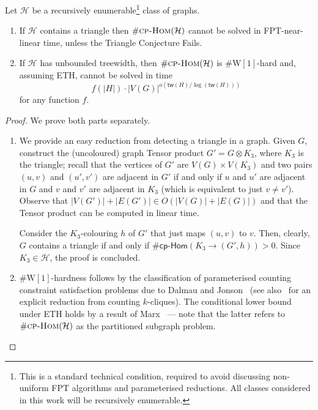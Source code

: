 \documentclass[authorcolumns,numberwithinsect]{no-lipics-v2022}
\newcommand{\W}{\mathrm{W}}
\newcommand{\cphomsprob}{\text{\sc{cp-Hom}}}
\newcommand{\cphoms}{\mathsf{cp}\text{-}\mathsf{Hom}}
\begin{document}
\begin{lemma}\label{lem:cphom_lower_bounds}
    Let $\mathcal{H}$ be a recursively enumerable\footnote{This is a standard technical condition, required to avoid discussing non-uniform FPT algorithms and parameterised reductions. All classes considered in this work will be recursively enumerable.} class of graphs.
    \begin{enumerate}
        \item If $\mathcal{H}$ contains a triangle then $\#\cphomsprob(\mathcal{H})$ cannot be solved in FPT-near-linear time, unless the Triangle Conjecture Fails.
        \item If $\mathcal{H}$ has unbounded treewidth, then $\#\cphomsprob(\mathcal{H})$ is $\#\W[1]$-hard and, assuming ETH, cannot be solved in time \[f(|H|)\cdot |V(G)|^{o(\mathsf{tw}(H)/\log(\mathsf{tw}(H)))}\]
        for any function $f$.
    \end{enumerate}
\end{lemma}
\begin{proof}
    We prove both parts separately.
\begin{enumerate}
    \item We provide an easy reduction from detecting a triangle in a graph. Given $G$, construct the (uncoloured) graph Tensor product $G' = G \otimes K_3$, where $K_3$ is the triangle; recall that the vertices of $G'$ are $V(G) \times V(K_3)$ and two pairs $(u,v)$ and $(u',v')$ are adjacent in $G'$ if and only if $u$ and $u'$ are adjacent in $G$ and $v$ and $v'$ are adjacent in $K_3$ (which is equivalent to just $v\neq v'$). Observe that $|V(G')|+|E(G')|\in O(|V(G)|+|E(G)|)$ and that the Tensor product can be computed in linear time.

    Consider the $K_3$-colouring $h$ of $G'$ that just maps $(u,v)$ to $v$. Then, clearly, $G$ contains a triangle if and only if $\#\cphoms(K_3 \to (G',h))>0$. Since $K_3 \in \mathcal{H}$, the proof is concluded.
    \item $\#\W[1]$-hardness follows by the classification of parameterised counting constraint satisfaction problems due to Dalmau and Jonson~\cite{DalmauJ04} (see also~\cite[Lemma 2.45]{Roth19} for an explicit reduction from counting $k$-cliques). The conditional lower bound under ETH holds by a result of Marx~\cite{Marx10} --- note that the latter refers to $\#\cphomsprob(\mathcal{H})$ as the partitioned subgraph problem.\qedhere
\end{enumerate}
\end{proof}
\end{document}
